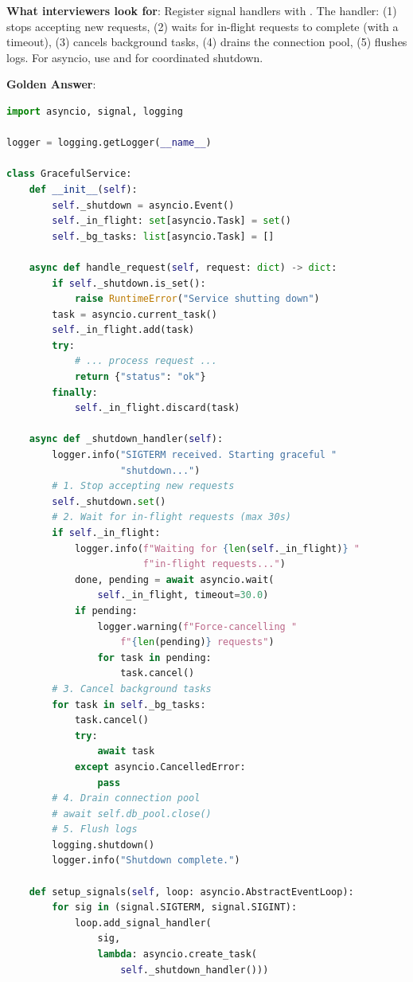 \textbf{What interviewers look for}: Register signal handlers with . The handler: (1) stops accepting new requests, (2) waits for in-flight requests to complete (with a timeout), (3) cancels background tasks, (4) drains the connection pool, (5) flushes logs. For asyncio, use  and  for coordinated shutdown.

\textbf{Golden Answer}:

\begin{lstlisting}[language=Python]
import asyncio, signal, logging

logger = logging.getLogger(__name__)

class GracefulService:
    def __init__(self):
        self._shutdown = asyncio.Event()
        self._in_flight: set[asyncio.Task] = set()
        self._bg_tasks: list[asyncio.Task] = []

    async def handle_request(self, request: dict) -> dict:
        if self._shutdown.is_set():
            raise RuntimeError("Service shutting down")
        task = asyncio.current_task()
        self._in_flight.add(task)
        try:
            # ... process request ...
            return {"status": "ok"}
        finally:
            self._in_flight.discard(task)

    async def _shutdown_handler(self):
        logger.info("SIGTERM received. Starting graceful "
                    "shutdown...")
        # 1. Stop accepting new requests
        self._shutdown.set()
        # 2. Wait for in-flight requests (max 30s)
        if self._in_flight:
            logger.info(f"Waiting for {len(self._in_flight)} "
                        f"in-flight requests...")
            done, pending = await asyncio.wait(
                self._in_flight, timeout=30.0)
            if pending:
                logger.warning(f"Force-cancelling "
                    f"{len(pending)} requests")
                for task in pending:
                    task.cancel()
        # 3. Cancel background tasks
        for task in self._bg_tasks:
            task.cancel()
            try:
                await task
            except asyncio.CancelledError:
                pass
        # 4. Drain connection pool
        # await self.db_pool.close()
        # 5. Flush logs
        logging.shutdown()
        logger.info("Shutdown complete.")

    def setup_signals(self, loop: asyncio.AbstractEventLoop):
        for sig in (signal.SIGTERM, signal.SIGINT):
            loop.add_signal_handler(
                sig,
                lambda: asyncio.create_task(
                    self._shutdown_handler()))
\end{lstlisting}

